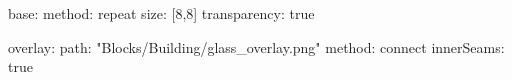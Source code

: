 base:
  method: repeat
  size: [8,8]
  transparency: true
  
overlay:
  path: "Blocks/Building/glass_overlay.png"
  method: connect
  innerSeams: true